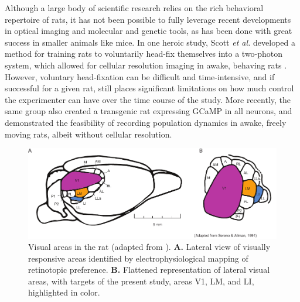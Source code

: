 Although a large body of scientific research relies on the rich behavioral repertoire of rats, it has not been possible to fully leverage recent developments in optical imaging and molecular and genetic tools, as has been done with great success in smaller animals like mice. In one heroic study, Scott \textit{et al.} developed a method for training rats to voluntarily head-fix themselves into a two-photon system, which allowed for cellular resolution imaging in awake, behaving rats \cite{Scott2013}. However, voluntary head-fixation can be difficult and time-intensive, and if successful for a given rat, still places significant limitations on how much control the experimenter can have over the time course of the study. More recently, the same group also created a transgenic rat expressing GCaMP in all neurons, and demonstrated the feasibility of recording population dynamics in awake, freely moving rats, albeit without cellular resolution\cite{Scott2018ImagingMacroscope}. 

\begin{figure}[t!]
    \includegraphics[width=\textwidth]{figures/chapter_2/fig_2-1_rat_visual_areas/fig_2-1_rat_visual_areas.pdf}
    \vspace{.1in}
    \caption[Visual areas in the rat]{Visual areas in the rat (adapted from \cite{Sereno1991}). 
    \textbf{A.} Lateral view of visually responsive areas identified by electrophysiological mapping of retinotopic preference. 
    \textbf{B.} Flattened representation of lateral visual areas, with targets of the present study, areas V1, LM, and LI, highlighted in color. 
    \label{fig:rat_visual_areas}}
\end{figure}

